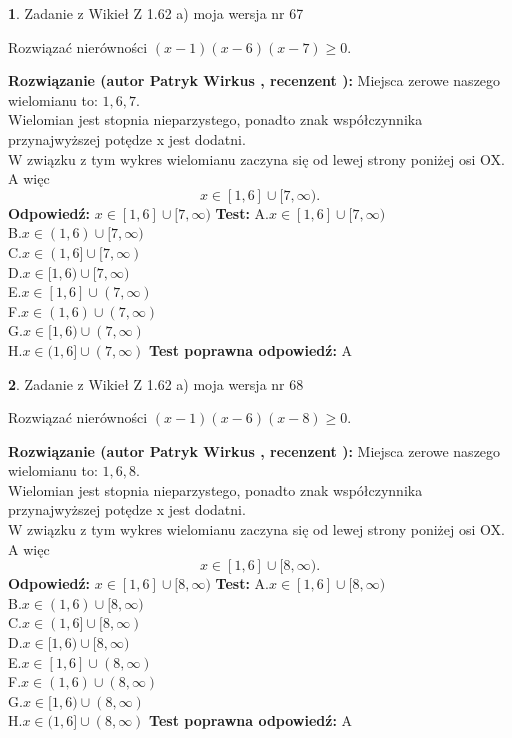 \documentclass[12pt, a4paper]{article}
\theoremstyle{definition} %
\newtheorem{zad}{}
\newcommand{\zadStart}[1]{\begin{zad}#1\newline}
\newcommand{\zadStop}{\end{zad}}
\newcommand{\rozwStart}[2]{\noindent \textbf{Rozwiązanie (autor #1 , recenzent #2): }\newline}
\newcommand{\rozwStop}{\newline}
\newcommand{\odpStart}{\noindent \textbf{Odpowiedź:}\newline}
\newcommand{\odpStop}{\newline}
\newcommand{\testStart}{\noindent \textbf{Test:}\newline}
\newcommand{\testStop}{\newline}
\newcommand{\kluczStart}{\noindent \textbf{Test poprawna odpowiedź:}\newline}
\newcommand{\kluczStop}{\newline}
\begin{document}
\zadStart{Zadanie z Wikieł Z 1.62 a) moja wersja nr 67}

Rozwiązać nierówności $(x-1)(x-6)(x-7)\ge0$.
\zadStop
\rozwStart{Patryk Wirkus}{}
Miejsca zerowe naszego wielomianu to: $1, 6, 7$.\\
Wielomian jest stopnia nieparzystego, ponadto znak współczynnika przy\linebreak najwyższej potędze x jest dodatni.\\ W związku z tym wykres wielomianu zaczyna się od lewej strony poniżej osi OX. A więc $$x \in [1,6] \cup [7,\infty).$$
\rozwStop
\odpStart
$x \in [1,6] \cup [7,\infty)$
\odpStop
\testStart
A.$x \in [1,6] \cup [7,\infty)$\\
B.$x \in (1,6) \cup [7,\infty)$\\
C.$x \in (1,6] \cup [7,\infty)$\\
D.$x \in [1,6) \cup [7,\infty)$\\
E.$x \in [1,6] \cup (7,\infty)$\\
F.$x \in (1,6) \cup (7,\infty)$\\
G.$x \in [1,6) \cup (7,\infty)$\\
H.$x \in (1,6] \cup (7,\infty)$
\testStop
\kluczStart
A
\kluczStop



\zadStart{Zadanie z Wikieł Z 1.62 a) moja wersja nr 68}

Rozwiązać nierówności $(x-1)(x-6)(x-8)\ge0$.
\zadStop
\rozwStart{Patryk Wirkus}{}
Miejsca zerowe naszego wielomianu to: $1, 6, 8$.\\
Wielomian jest stopnia nieparzystego, ponadto znak współczynnika przy\linebreak najwyższej potędze x jest dodatni.\\ W związku z tym wykres wielomianu zaczyna się od lewej strony poniżej osi OX. A więc $$x \in [1,6] \cup [8,\infty).$$
\rozwStop
\odpStart
$x \in [1,6] \cup [8,\infty)$
\odpStop
\testStart
A.$x \in [1,6] \cup [8,\infty)$\\
B.$x \in (1,6) \cup [8,\infty)$\\
C.$x \in (1,6] \cup [8,\infty)$\\
D.$x \in [1,6) \cup [8,\infty)$\\
E.$x \in [1,6] \cup (8,\infty)$\\
F.$x \in (1,6) \cup (8,\infty)$\\
G.$x \in [1,6) \cup (8,\infty)$\\
H.$x \in (1,6] \cup (8,\infty)$
\testStop
\kluczStart
A
\kluczStop
\end{document}
